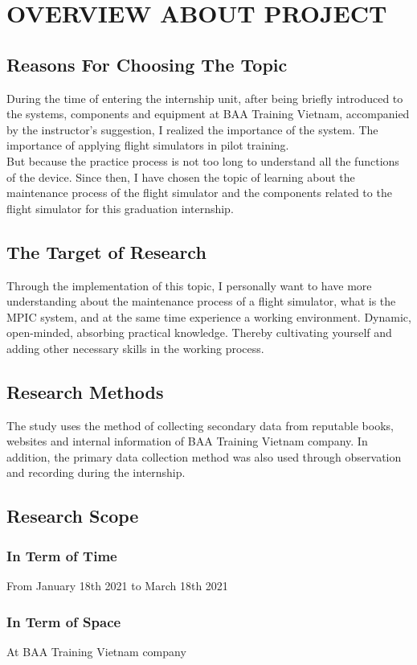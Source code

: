 \chapter{OVERVIEW ABOUT PROJECT}

\renewcommand{\headrulewidth}{0.5pt}
\renewcommand{\footrulewidth}{0.5pt}
\thispagestyle{plain}
\pagestyle{fancy}
\fancyhf{}
\raggedright
{}

\section{Reasons For Choosing The Topic}
    During the time of entering the internship unit, after being briefly introduced to the systems, components and equipment 
    at BAA Training Vietnam, accompanied by the instructor's suggestion, I realized the importance of the system. The importance 
    of applying flight simulators in pilot training. \\ 
    \vspace{3mm}
    But because the practice process is not too long to understand all the functions of the device. Since then, I have chosen the 
    topic of learning about the maintenance process of the flight simulator and the components related to the flight simulator for 
    this graduation internship.

\section{The Target of Research}
    Through the implementation of this topic, I personally want to have more understanding about the maintenance process of a flight 
    simulator, what is the MPIC system, and at the same time experience a working environment. Dynamic, open-minded, absorbing practical 
    knowledge. Thereby cultivating yourself and adding other necessary skills in the working process.

\section{Research Methods}
    The study uses the method of collecting secondary data from reputable books, websites and internal information of BAA Training Vietnam 
    company. In addition, the primary data collection method was also used through observation and recording during the internship.

\section{Research Scope}
    \subsection{In Term of Time}
        From January 18th 2021 to March 18th 2021
    \subsection{In Term of Space}
        At BAA Training Vietnam company